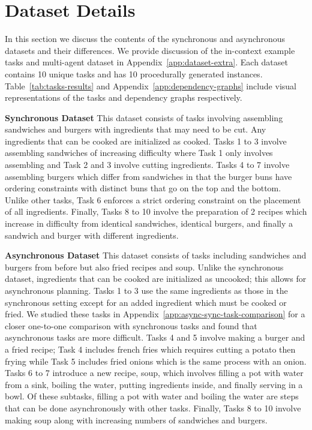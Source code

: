 
\section{Dataset Details}
\label{sec:baselines}
\vspace{-1em}

In this section we discuss the contents of the synchronous and asynchronous datasets and their differences. We provide discussion of the in-context example tasks and multi-agent dataset in Appendix~\ref{app:dataset-extra}. Each dataset contains 10 unique tasks and has 10 procedurally generated instances. Table~\ref{tab:tasks-results} and Appendix~\ref{app:dependency-graphs} include visual representations of the tasks and dependency graphs respectively.


\textbf{Synchronous Dataset} This dataset consists of tasks involving assembling sandwiches and burgers with ingredients that may need to be cut. Any ingredients that can be cooked are initialized as cooked. Tasks 1 to 3 involve assembling sandwiches of increasing difficulty where Task 1 only involves assembling and Task 2 and 3 involve cutting ingredients. Tasks 4 to 7 involve assembling burgers which differ from sandwiches in that the burger buns have ordering constraints with distinct buns that go on the top and the bottom. Unlike other tasks, Task 6 enforces a strict ordering constraint on the placement of all ingredients. Finally, Tasks 8 to 10 involve the preparation of 2 recipes which increase in difficulty from identical sandwiches, identical burgers, and finally a sandwich and burger with different ingredients.

\textbf{Asynchronous Dataset} This dataset consists of tasks including sandwiches and burgers from before but also fried recipes and soup. Unlike the synchronous dataset, ingredients that can be cooked are initialized as uncooked; this allows for asynchronous planning. Tasks 1 to 3 use the same ingredients as those in the synchronous setting except for an added ingredient which must be cooked or fried. We studied these tasks in Appendix~\ref{app:async-sync-task-comparison} for a closer one-to-one comparison with synchronous tasks and found that asynchronous tasks are more difficult. Tasks 4 and 5 involve making a burger and a fried recipe; Task 4 includes french fries which requires cutting a potato then frying while Task 5 includes fried onions which is the same process with an onion. Tasks 6 to 7 introduce a new recipe, soup, which involves filling a pot with water from a sink, boiling the water, putting ingredients inside, and finally serving in a bowl. Of these subtasks, filling a pot with water and boiling the water are steps that can be done asynchronously with other tasks. Finally, Tasks 8 to 10 involve making soup along with increasing numbers of sandwiches and burgers.